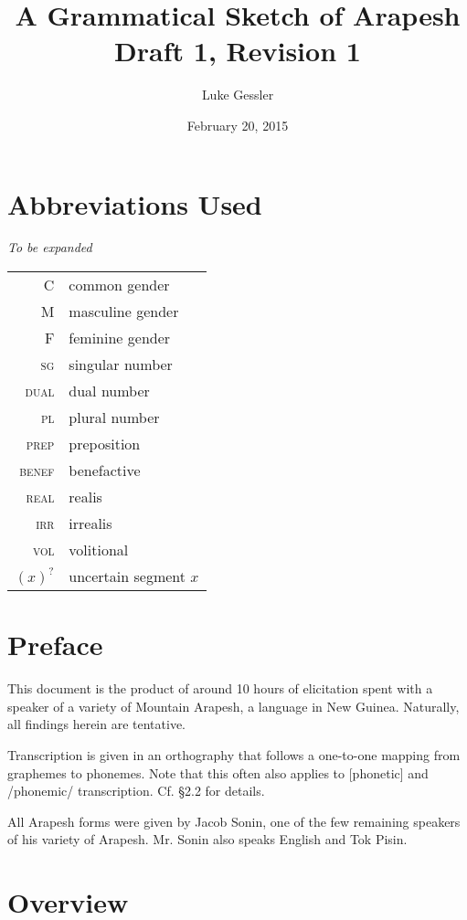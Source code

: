 \documentclass[pdftex,12pt,letterpaper]{article}
\title{A Grammatical Sketch of Arapesh \\ Draft 1, Revision 1}
\author{Luke Gessler}
\date{February 20, 2015}
\begin{document}

\tableofcontents
\listoffigures
\pagebreak
\section*{Abbreviations Used}
\emph{To be expanded} \\

\begin{tabular}{rl}
\textsc{C} & common gender \\
\textsc{M} & masculine gender \\
\textsc{F} & feminine gender \\
\textsc{sg} & singular number \\
\textsc{dual} & dual number \\
\textsc{pl} & plural number \\
\textsc{prep} & preposition \\
\textsc{benef} & benefactive \\
\textsc{real} & realis \\
\textsc{irr} & irrealis \\
\textsc{vol} & volitional \\
$(x)^?$ & uncertain segment $x$ \\

\end{tabular}
\pagebreak
\doublespacing

\section*{Preface}

This document is the product of around 10 hours of elicitation spent with a speaker of a variety of Mountain Arapesh, a language in New Guinea. Naturally, all findings herein are tentative.

Transcription is given in an orthography that follows a one-to-one mapping from graphemes to phonemes. Note that this often also applies to [phonetic] and /phonemic/ transcription. Cf. \S 2.2 for details.

All Arapesh forms were given by Jacob Sonin, one of the few remaining speakers of his variety of Arapesh. Mr. Sonin also speaks English and Tok Pisin.

\section{Overview}
\end{document}
